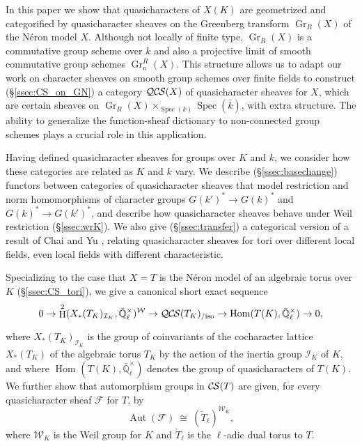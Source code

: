 \documentclass[10pt]{amsart}
\theoremstyle{plain}
\theoremstyle{definition}
\theoremstyle{remark}
\newcommand{\EE}{\mathbb{\bar Q}_\ell}
\newcommand{\bFq}{\bar{k}}
\newcommand{\Fq}{k}
\newcommand{\EEx}{\EE^\times}
\newcommand{\Weil}[1]{\mathcal{W}_{#1}}
\DeclareMathOperator{\Aut}{Aut}
\DeclareMathOperator{\Hom}{Hom}
\DeclareMathOperator{\Gr}{Gr}
\DeclareMathOperator{\Hh}{H}
\newcommand{\Spec}[1]{{\operatorname{Spec}(#1)}}
\newcommand{\iso}{{\ \cong\ }}
\newcommand{\cs}[1]{{\mathcal{#1}}}
\newcommand{\CS}{{\mathcal{C\hskip-0.8pt S}}}
\newcommand{\QCS}{{\mathcal{QC\hskip-0.8pt S}}}
\newcommand{\QCSiso}[1]{\QCS(#1)_{/\text{iso}}}
\begin{document}
In this paper we show that quasicharacters of $X(K)$ are geometrized and categorified by quasicharacter sheaves on the
Greenberg transform $\Gr_R(X)$ of the N\'eron model $X$.
Although not locally of finite type, $\Gr_R(X)$ is a commutative group scheme over $\Fq$ and also a projective limit of smooth commutative group schemes $\Gr^R_n(X)$.
This structure allows us to adapt our work on character sheaves on smooth group schemes over finite fields to construct (\S\ref{ssec:CS_on_GN}) a category $\QCS(X)$
of quasicharacter sheaves for $X$, which are certain sheaves on $\Gr_R(X)\times_{\Spec{\Fq}} \Spec{\bFq}$, with extra structure.
The ability to generalize the function-sheaf dictionary to non-connected group schemes plays a crucial role in this application.

Having defined quasicharacter sheaves for groups over $K$ and $\Fq$, we consider how
these categories are related as $K$ and $\Fq$ vary.  We describe (\S\ref{ssec:basechange}) functors between categories
of quasicharacter sheaves that model restriction and norm homomorphisms of character groups $G(k')^* \to G(k)^*$ and $G(k)^* \to G(k')^*$,
and describe how quasicharacter sheaves behave under Weil restriction (\S\ref{ssec:wrK}).  We also give (\S\ref{ssec:transfer})
a categorical version of a result of Chai and Yu \cite{chai-yu:01a},
relating quasicharacter sheaves for tori over different local fields, even local fields
with different characteristic.

Specializing to the case that $X = T$ is the N\'eron model of an algebraic torus over $K$ (\S\ref{ssec:CS_tori}), 
we give a canonical short exact sequence 
\[
0 \to \Hh^2(X_*(T_K)_{\mathcal{I}_K},\EEx)^{\Weil{}} \to \QCSiso{T_K} \to \Hom_\text{}(T(K),\EEx) \to 0,
\]
where $X_*(T_K)_{\mathcal{I}_K}$ is the group of coinvariants of the cocharacter lattice $X_*(T_K)$ of the algebraic torus $T_K$ by the action of the inertia group $\mathcal{I}_K$ of $K$, and where $\Hom_\text{}(T(K),\EEx)$ denotes the group of quasicharacters of $T(K)$.
We further show that automorphism groups in $\CS(T)$ are given, for every quasicharacter sheaf $\cs{F}$ for $T$, by
\[
\Aut(\cs{F}) \iso (\check{T}_\ell)^{\Weil{K}},
\]
where $\Weil{K}$ is the Weil group for $K$ and $\check{T}_\ell$ is the $\ell$-adic dual torus to $T$.
\end{document}
